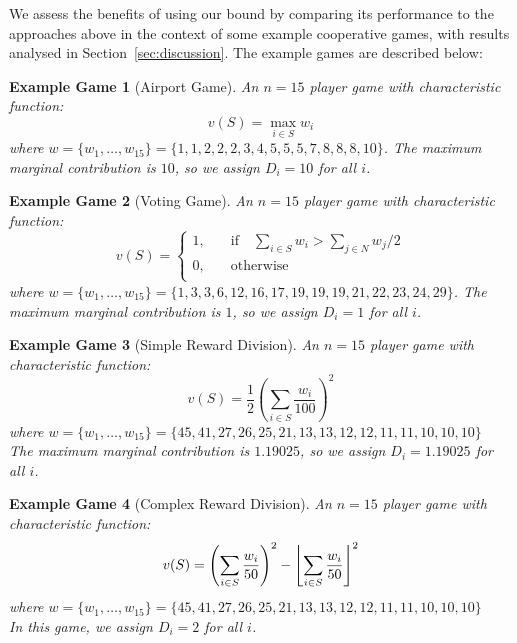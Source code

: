 \documentclass[
10pt, %
a4paper, %
oneside, %
headinclude,footinclude, %
BCOR5mm, %
]{scrartcl}
\DeclarePairedDelimiter{\floor}{\lfloor}{\rfloor}
\newtheorem{example_game}{Example Game}
\begin{document}
We assess the benefits of using our bound by comparing its performance to the approaches above in the context of some example cooperative games, with results analysed in Section~\ref{sec:discussion}.
The example games are described below:

\begin{example_game}[Airport Game]
An $n=15$ player game with characteristic function:
$$v(S)=\max_{i\in S}w_i$$
where
$w=\{w_1,\dots,w_{15}\} %
=\{ 1, 1, 2, 2, 2, 3, 4, 5, 5, 5, 7, 8, 8, 8, 10\}$.
The maximum marginal contribution is $10$, so we assign $D_i=10$ for all $i$.
\end{example_game}

\begin{example_game}[Voting Game]
An $n=15$ player game with characteristic function:
$$v(S)=\begin{cases}
       1, &\quad\text{if}\quad \sum_{i\in S}w_i>\sum_{j\in N}w_j/2\\
       0, &\quad\text{otherwise}\\
     \end{cases}$$
where 
$w=\{w_1,\dots,w_{15}\} %
=\{ 1, 3, 3, 6, 12, 16, 17, 19, 19, 19, 21, 22, 23, 24, 29\}$.
The maximum marginal contribution is $1$, so we assign $D_i=1$ for all $i$.
\end{example_game}

\begin{example_game}[Simple Reward Division]
An $n=15$ player game with characteristic function:
$$v(S)=\frac{1}{2}\left(\sum_{i\in S}\frac{w_i}{100}\right)^2$$
where
$w=\{w_1,\dots,w_{15}\} = \{ 45, 41, 27, 26, 25, 21, 13, 13, 12, 12, 11, 11, 10, 10, 10 \}$\\
The maximum marginal contribution is $1.19025$, so we assign $D_i=1.19025$ for all $i$.
\end{example_game}

\begin{example_game}[Complex Reward Division]
An $n=15$ player game with characteristic function:
$$v(S)=\left(\sum_{i\in S}\frac{w_i}{50}\right)^2 - \floor[\Bigg]{\sum_{i\in S}\frac{w_i}{50}}^2$$
where
$w=\{w_1,\dots,w_{15}\} = \{ 45, 41, 27, 26, 25, 21, 13, 13, 12, 12, 11, 11, 10, 10, 10 \}$\\
In this game, we assign $D_i=2$ for all $i$.
\end{example_game}

%


\end{document}
